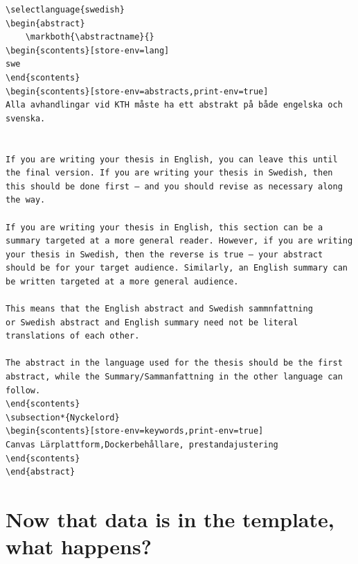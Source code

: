 \begin{lstlisting}[language={[LaTeX]TeX}, caption={\LaTeX~input to produce the Swedish abstract}, label=lst:SwedishAbstract] 
 \selectlanguage{swedish} 
\begin{abstract}
    \markboth{\abstractname}{}
\begin{scontents}[store-env=lang]
swe
\end{scontents}
\begin{scontents}[store-env=abstracts,print-env=true]
Alla avhandlingar vid KTH måste ha ett abstrakt på både engelska och svenska.


If you are writing your thesis in English, you can leave this until the final version. If you are writing your thesis in Swedish, then this should be done first – and you should revise as necessary along the way.

If you are writing your thesis in English, this section can be a summary targeted at a more general reader. However, if you are writing your thesis in Swedish, then the reverse is true – your abstract should be for your target audience. Similarly, an English summary can be written targeted at a more general audience.

This means that the English abstract and Swedish sammnfattning  
or Swedish abstract and English summary need not be literal translations of each other.

The abstract in the language used for the thesis should be the first abstract, while the Summary/Sammanfattning in the other language can follow.
\end{scontents}
\subsection*{Nyckelord}
\begin{scontents}[store-env=keywords,print-env=true]
Canvas Lärplattform,Dockerbehållare, prestandajustering
\end{scontents}
\end{abstract}
\end{lstlisting}


\clearpage
\section{Now that data is in the template, what happens?}
\label{sec:nowThatDataIsInTheTemplate}

